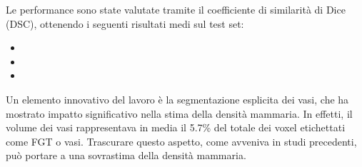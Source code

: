 Le performance sono state valutate tramite il coefficiente di similarità di Dice (DSC), ottenendo i seguenti risultati medi sul test set:
\begin{itemize}
\item {}
\item {}
\item {}
\end{itemize}

Un elemento innovativo del lavoro è la segmentazione esplicita dei vasi, che ha mostrato impatto significativo nella stima della densità mammaria. In effetti, il volume dei vasi rappresentava in media il 5.7\% del totale dei voxel etichettati come FGT o vasi. Trascurare questo aspetto, come avveniva in studi precedenti, può portare a una sovrastima della densità mammaria.



